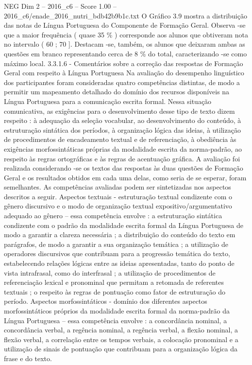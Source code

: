 \begin{textsample}{NEG Dim 2 – 2016\_c6 – Score 1.00 – 2016\_c6/enade\_2016\_nutri\_bdb42b9b1c.txt}
O Gráfico 3.9 mostra a distribuição das notas de Língua Portuguesa do Componente de Formação Geral.
Observa -se que a maior frequência ( quase 35 \% ) corresponde aos alunos que obtiveram nota no intervalo ( 60 ; 70 ].
Destacam -se, também, os alunos que deixaram ambas as questões em branco representando cerca de 8 \% do total, caracterizando -se como máximo local. 3.3.1.6 - Comentários sobre a correção das respostas de Formação Geral com respeito à Língua Portuguesa Na avaliação do desempenho linguístico dos participantes foram consideradas quatro competências distintas, de modo a permitir um mapeamento detalhado do domínio dos recursos disponíveis na Língua Portuguesa para a comunicação escrita formal.
Nessa situação comunicativa, as exigências para o desenvolvimento desse tipo de texto dizem respeito : à adequação da seleção vocabular, ao desenvolvimento do conteúdo, à estruturação sintática dos períodos, à organização lógica das ideias, à utilização de procedimentos de encadeamento textual e de referenciação, à obediência às exigências morfossintáticas próprias da modalidade escrita da norma-padrão, ao respeito às regras ortográficas e às regras de acentuação gráfica.
A avaliação foi realizada considerando -se os textos das respostas às duas questões de Formação Geral e os resultados obtidos em cada uma delas, como seria de se esperar, foram semelhantes.
As competências avaliadas podem ser sintetizadas nos aspectos descritos a seguir.
Aspectos textuais - estruturação textual condizente com o gênero discursivo e o modo de organização textual expositivo/argumentativo adequado ao gênero – essa competência envolve : a estruturação sintática condizente com o padrão da modalidade escrita formal da Língua Portuguesa de modo a garantir a clareza necessária ; a distribuição do conteúdo do texto em parágrafos, de modo a garantir a sua organização temática ; a utilização de operadores discursivos que contribuam para a progressão temática do texto, estabelecendo relações lógicas entre as ideias apresentadas, tanto do ponto de vista intrafrasal, como do interfrasal ; a utilização de procedimentos de referenciação lexical e pronominal que permitam a retomada de referentes textuais ; o respeito às regras de pontuação como fator de estruturação do período.
Aspectos morfossintáticos - domínio dos diferentes aspectos morfossintáticos próprios da modalidade escrita formal da norma-padrão da Língua Portuguesa – essa competência envolve : a concordância nominal, a concordância verbal, a regência nominal, a regência verbal, a flexão nominal, a flexão verbal, a correlação entre os tempos verbais, a colocação pronominal e a utilização de sinais de pontuação que contribuam para a organização lógica da frase e do texto.

\end{textsample}
